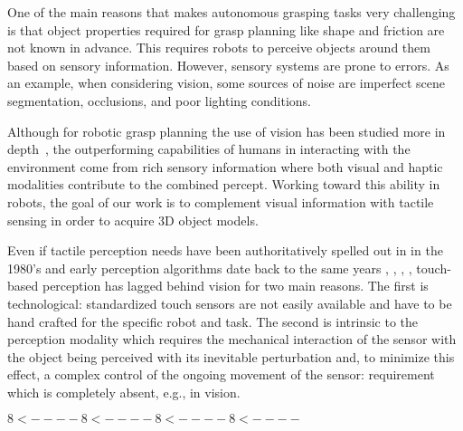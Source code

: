 
One of the main reasons that makes autonomous grasping tasks very challenging is that object properties required for grasp planning like shape and friction are not known %
in advance. 
This requires robots to perceive objects around them based on sensory information. However, sensory systems are prone to errors. As an example, when considering vision, some sources of noise are imperfect scene segmentation, occlusions, and poor lighting conditions.

Although for robotic grasp planning the use of vision has been studied more in depth~\cite{Kragic2002TechRep}, the outperforming capabilities of humans in interacting with the environment come from rich sensory information where both visual and haptic modalities contribute to the combined percept. Working toward this ability in robots, the goal of our work is to complement visual information with tactile sensing in order to acquire 3D object models.

Even if tactile perception needs have been authoritatively spelled out in \cite{Bajcsy1988Active} in the 1980's and early perception algorithms date back to the same years \cite{Grimson1984JRR}, \cite{Faugeras1983IJCAI}, \cite{Shekhar1986ICRA}, \cite{Bajcsy1989Machine}, touch-based perception has lagged behind vision for two main reasons. The first is technological: standardized touch sensors are not easily available and have to be hand crafted for the specific robot and task. The second is intrinsic to the perception modality which requires the mechanical interaction of the sensor with the object being perceived with its inevitable perturbation and, to minimize this effect, a complex control of the ongoing movement of the sensor: requirement which is completely absent, e.g., in vision.

$ 8< ---- 8< ---- 8< ---- 8< ---- $








